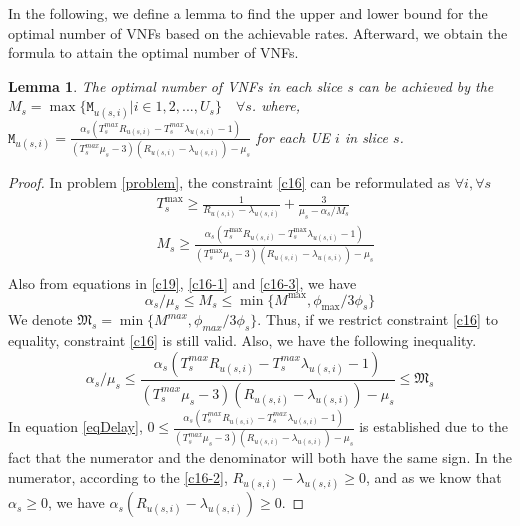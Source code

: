 \documentclass[conference]{IEEEtran}
\newtheorem{lemma}{Lemma}
\begin{document}
In the following, we define a lemma to find the upper and lower bound for the optimal number of VNFs based on the achievable rates. Afterward, we obtain the formula to attain the optimal number of VNFs.  
\begin{lemma}
The optimal number of VNFs in each slice s can be achieved by the 
$M_s = \max\{\mathtt{M}_{u(s,i)} | i \in 1,2,..., U_s\} \quad \forall s$.
where, $\mathtt{M}_{u(s,i)} = \frac{\alpha_s(T^{max}_s R_{u(s,i)}-T^{max}_s\lambda_{u(s,i)} -1)}{(T^{max}_s\mu_s-3)(R_{u(s,i)}-\lambda_{u(s,i)}) - \mu_s }$ for each UE $i$ in slice $s$.

\end{lemma}
\begin{proof}
In problem \eqref{problem}, the constraint \eqref{c16} can be reformulated as
$ \forall i,\forall s$
\begin{equation}
\begin{split}
&T^{\max}_s \geq\frac{1}{R_{u(s,i)} - \lambda_{u(s,i)}} + \frac{3}{\mu_s - \alpha_{s}/{M_s}}  \\
&M_s \geq \frac{\alpha_s(T^{\max}_s R_{u(s,i)}-T^{\max}_s\lambda_{u(s,i)} -1)}{(T^{\max}_s\mu_s-3)(R_{u(s,i)}-\lambda_{u(s,i)}) - \mu_s }\\
\end{split}
\end{equation}
Also from equations in \eqref{c19}, \eqref{c16-1} and \eqref{c16-3}, we have
\begin{equation}
\alpha_s/\mu_s\leq M_s \leq \min\{M^{\max}, \phi_{\max}/{3\phi_s}\}
\end{equation}
We denote $ \mathfrak{M}_s= \min\{M^{max}, \phi_{max}/{3\phi_s}\}$.
Thus, if we restrict constraint \eqref{c16} to equality, constraint \eqref{c16} is still valid.
Also, we have the following inequality.
\begin{equation}\label{eqDelay}
\alpha_s/\mu_s\leq \frac{\alpha_s(T^{max}_s R_{u(s,i)}-T^{max}_s\lambda_{u(s,i)} -1)}{(T^{max}_s\mu_s-3)(R_{u(s,i)}-\lambda_{u(s,i)}) - \mu_s } \leq \mathfrak{M}_s
\end{equation}
In equation \eqref{eqDelay}, $0\leq \frac{\alpha_s(T^{max}_s R_{u(s,i)}-T^{max}_s\lambda_{u(s,i)} -1)}{(T^{max}_s\mu_s-3)(R_{u(s,i)}-\lambda_{u(s,i)}) - \mu_s }$ is established due to the fact that 
the numerator and the denominator will both have the same sign.
In the numerator, according to the \eqref{c16-2}, $ R_{u(s,i)}-\lambda_{u(s,i)} \geq 0$, and as we know that $\alpha_s \geq 0$, we have $ \alpha_s (R_{u(s,i)}-\lambda_{u(s,i)}) \geq 0 $.

\end{proof}
\end{document}
